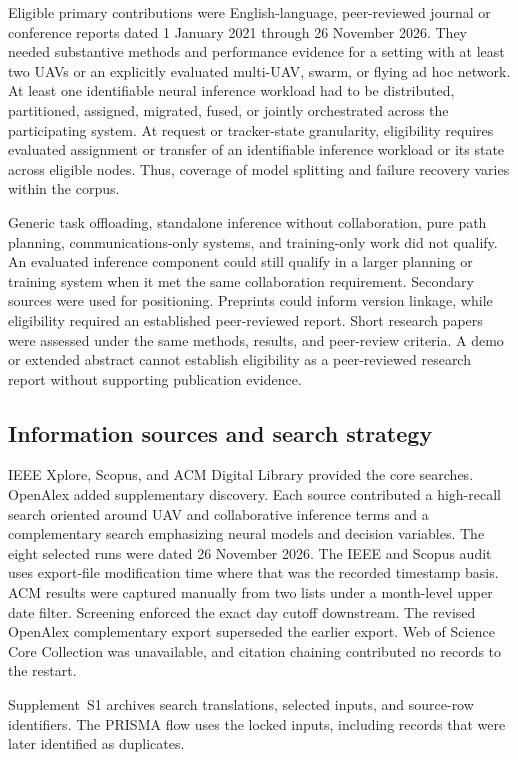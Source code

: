 \documentclass[pdflatex,sn-vancouver-num]{sn-jnl}
\begin{document}
Eligible primary contributions were English-language, peer-reviewed journal or conference reports dated 1 January 2021 through 26 November 2026. They needed substantive methods and performance evidence for a setting with at least two UAVs or an explicitly evaluated multi-UAV, swarm, or flying ad hoc network. At least one identifiable neural inference workload had to be distributed, partitioned, assigned, migrated, fused, or jointly orchestrated across the participating system. At request or tracker-state granularity, eligibility requires evaluated assignment or transfer of an identifiable inference workload or its state across eligible nodes. Thus, coverage of model splitting and failure recovery varies within the corpus.

Generic task offloading, standalone inference without collaboration, pure path planning, communications-only systems, and training-only work did not qualify. An evaluated inference component could still qualify in a larger planning or training system when it met the same collaboration requirement. Secondary sources were used for positioning. Preprints could inform version linkage, while eligibility required an established peer-reviewed report. Short research papers were assessed under the same methods, results, and peer-review criteria. A demo or extended abstract cannot establish eligibility as a peer-reviewed research report without supporting publication evidence.

\subsection{Information sources and search strategy}
IEEE Xplore, Scopus, and ACM Digital Library provided the core searches. OpenAlex added supplementary discovery. Each source contributed a high-recall search oriented around UAV and collaborative inference terms and a complementary search emphasizing neural models and decision variables. The eight selected runs were dated 26 November 2026. The IEEE and Scopus audit uses export-file modification time where that was the recorded timestamp basis. ACM results were captured manually from two lists under a month-level upper date filter. Screening enforced the exact day cutoff downstream. The revised OpenAlex complementary export superseded the earlier export. Web of Science Core Collection was unavailable, and citation chaining contributed no records to the restart.

Supplement~S1 archives search translations, selected inputs, and source-row identifiers. The PRISMA flow uses the locked inputs, including records that were later identified as duplicates.
\end{document}
